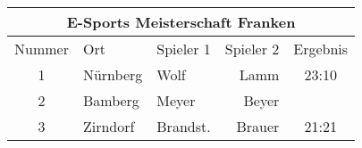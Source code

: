 \begin{tabular}{c|p{40mm}|lr|c}
\multicolumn{5}{c}{E-Sports Meisterschaft Franken} \\
\hline
\hline
Nummer & Ort & Spieler 1 & Spieler 2 & Ergebnis \\
\hline
1 & Nürnberg & Wolf & Lamm & 23:10 \\
\hline
2 & Bamberg & Meyer & Beyer \\
\hline
3 & Zirndorf & Brandst. & Brauer & 21:21\\
\hline
\end{tabular}
